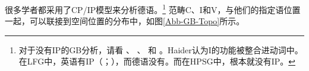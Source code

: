 很多学者都采用了CP/IP模型来分析德语。\footnote{%
对于没有IP的GB分析，请看 、 、 和 。Haider认为I的功能被整合进动词中。在LFG中，英语有IP（\citealp[\S~6.2]{Bresnan2001a}；\citealp[\S~3.2.1]{Dalrymple2001a-u}），而德语没有\citep[\S~3.2.3.2]{Berman2003a}。而在HPSG中，根本就没有IP。
} 
范畴C、I和V，与他们的指定语位置一起，可以联接到空间位置的分布中，如图\vref{Abb-GB-Topo}所示。

